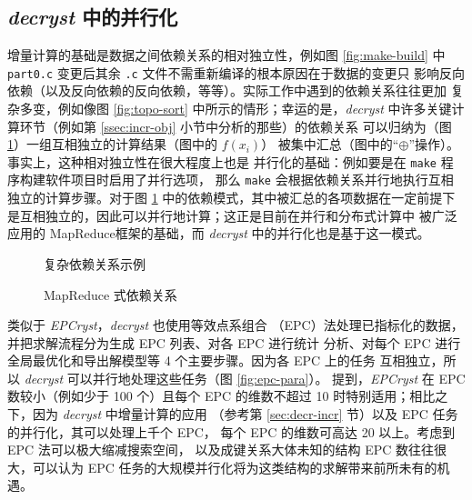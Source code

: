 \subsection{\emph{decryst} 中的并行化}\label{ssec:decr-para}

增量计算的基础是数据之间依赖关系的相对独立性，例如图 \ref{fig:make-build} 中
\verb|part0.c| 变更后其余 \verb|.c| 文件不需重新编译的根本原因在于数据的变更只
影响反向依赖（以及反向依赖的反向依赖，等等）。实际工作中遇到的依赖关系往往更加
复杂多变，例如像图 \ref{fig:topo-sort} 中所示的情形；幸运的是，\emph{decryst}
中许多关键计算环节（例如第 \ref{ssec:incr-obj} 小节中分析的那些）的依赖关系
可以归纳为（图 \ref{fig:map-reduce}）一组互相独立的计算结果（图中的 $f(x_i)$）
被集中汇总（图中的“$\oplus$”操作）。事实上，这种相对独立性在很大程度上也是
并行化的基础：例如要是在 \verb|make| 程序构建软件项目时启用了并行选项，
那么 \verb|make| 会根据依赖关系并行地执行互相独立的计算步骤。对于图
\ref{fig:map-reduce} 中的依赖模式，其中被汇总的各项数据在一定前提下
是互相独立的，因此可以并行地计算；这正是目前在并行和分布式计算中
被广泛应用的 MapReduce\parencite{dean2004}框架的基础，而
\emph{decryst} 中的并行化也是基于这一模式。

\begin{figure}[htbp!]\bfcmd
\begin{floatrow}
\setlength{\columnsep}{2.5em}
	{\caption{复杂依赖关系示例}\label{fig:topo-sort}}
	{\caption{MapReduce 式依赖关系}\label{fig:map-reduce}}
\end{floatrow}
\end{figure}

类似于 \emph{EPCryst}\parencite{deng2011}，\emph{decryst} 也使用等效点系组合
（EPC）法处理已指标化的数据，并把求解流程分为生成 EPC 列表、对各 EPC 进行统计
分析、对每个 EPC 进行全局最优化和导出解模型等 4 个主要步骤。因为各 EPC 上的任务
互相独立，所以 \emph{decryst} 可以并行地处理这些任务（图 \ref{fig:epc-para}）。%
\textcite{deng2011}提到，\emph{EPCryst} 在 EPC 数较小（例如少于 100 个）且每个
EPC 的维数不超过 10 时特别适用；相比之下，因为 \emph{decryst} 中增量计算的应用
（参考第 \ref{sec:decr-incr} 节）以及 EPC 任务的并行化，其可以处理上千个 EPC，
每个 EPC 的维数可高达 20 以上。考虑到 EPC 法可以极大缩减搜索空间，
以及成键关系大体未知的结构 EPC 数往往很大，可以认为 EPC
任务的大规模并行化将为这类结构的求解带来前所未有的机遇。


